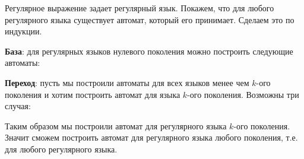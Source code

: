 
Регулярное выражение задает регулярный язык. Покажем, что для любого регулярного
языка существует автомат, который его принимает. Сделаем это по индукции.

\textbf{База}: для регулярных языков нулевого поколения можно построить
следующие автоматы:



\textbf{Переход}: пусть мы построили автоматы для всех языков менее чем
\(k\)-ого поколения и хотим построить автомат для языка \(k\)-ого поколения.
Возможны три случая:



Таким образом мы построили автомат для регулярного языка \(k\)-ого поколения.
Значит сможем построить автомат для регулярного языка любого поколения, т.е. для
любого регулярного языка.
